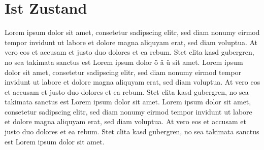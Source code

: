 \documentclass[
a4paper, 			%
12pt,					%
headsepline,	%
ngerman,			%
]{scrartcl} %
\begin{document}
	
	
	
	\setcounter{page}{0}
	
	
	
	
	\singlespacing
	
	\newpage
	\tableofcontents
	
	
	\newpage
	
	\setcounter{page}{1}
	
	\newpage
	\fancyhead[L]{\nouppercase{\leftmark}} %
	
	\onehalfspacing
	
	
	\newpage \addtocounter{page}{-1}
	\thispagestyle{empty} 
	\mbox{}
	
	\newpage
	\section{Ist Zustand}
	Lorem ipsum dolor sit amet, consetetur sadipscing elitr, sed diam nonumy eirmod tempor invidunt ut labore et dolore magna aliquyam erat, sed diam voluptua. At vero eos et accusam et justo duo dolores et ea rebum. Stet clita kasd gubergren, no sea takimata sanctus est Lorem ipsum dolor ö ä ü sit amet. Lorem ipsum dolor sit amet, consetetur sadipscing elitr, sed diam nonumy eirmod tempor invidunt ut labore et dolore magna aliquyam erat, sed diam voluptua. At vero eos et accusam et justo duo dolores et ea rebum. Stet clita kasd gubergren, no sea takimata sanctus est Lorem ipsum dolor sit amet. Lorem ipsum dolor sit amet, consetetur sadipscing elitr, sed diam nonumy eirmod tempor invidunt ut labore et dolore magna aliquyam erat, sed diam voluptua. At vero eos et accusam et justo duo dolores et ea rebum. Stet clita kasd gubergren, no sea takimata sanctus est Lorem ipsum dolor sit amet.
	
\end{document}
